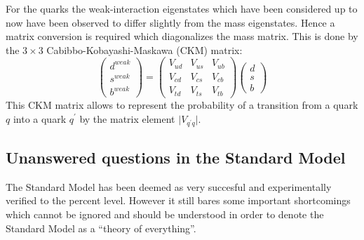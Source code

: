For the quarks the weak-interaction eigenstates which have been considered up to now have been observed to differ slightly from the mass eigenstates. Hence a matrix conversion is required which diagonalizes the mass matrix. This is done by the $3 \times3$ Cabibbo-Kobayashi-Maskawa (CKM) matrix:
\begin{equation}
 \begin{pmatrix}
  d^{weak} \\ s^{weak} \\ b^{weak} 
 \end{pmatrix}
 = \begin{pmatrix}
    V_{ud} & V_{us} & V_{ub} \\ V_{cd} & V_{cs} & V_{cb} \\ V_{td} & V_{ts} & V_{tb}
   \end{pmatrix}
   \begin{pmatrix}
    d \\ s \\ b
   \end{pmatrix}
\end{equation}
This CKM matrix allows to represent the probability of a transition from a quark $q$ into a quark $q^{'}$ by the matrix element $\vert V_{q^{'}q} \vert$.

\subsection{Unanswered questions in the Standard Model} \label{sec::QuestionsSM}
The Standard Model has been deemed as very succesful and experimentally verified to the percent level. However it still bares some important shortcomings which cannot be ignored and should be understood in order to denote the Standard Model as a ``theory of everything''. 


